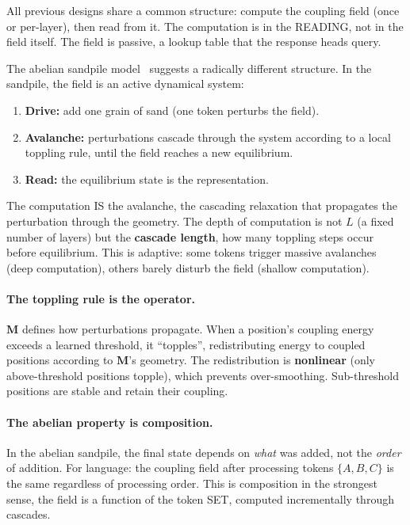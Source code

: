\documentclass[11pt, a4paper]{article}
\newcommand{\M}{\mathbf{M}}
\theoremstyle{plain}
\theoremstyle{definition}
\theoremstyle{remark}
\begin{document}
All previous designs share a common structure: compute the coupling field (once or per-layer), then read from it.
The computation is in the READING, not in the field itself.
The field is passive, a lookup table that the response heads query.

The abelian sandpile model~\cite{bak1987self} suggests a radically different structure.
In the sandpile, the field is an active dynamical system:
\begin{enumerate}[nosep]
\item \textbf{Drive:} add one grain of sand (one token perturbs the field).
\item \textbf{Avalanche:} perturbations cascade through the system according to a local toppling rule, until the field reaches a new equilibrium.
\item \textbf{Read:} the equilibrium state is the representation.
\end{enumerate}

The computation IS the avalanche, the cascading relaxation that propagates the perturbation through the geometry.
The depth of computation is not $L$ (a fixed number of layers) but the \textbf{cascade length}, how many toppling steps occur before equilibrium.
This is adaptive: some tokens trigger massive avalanches (deep computation), others barely disturb the field (shallow computation).

\paragraph{The toppling rule is the operator.}
$\M$ defines how perturbations propagate.
When a position's coupling energy exceeds a learned threshold, it ``topples'', redistributing energy to coupled positions according to $\M$'s geometry.
The redistribution is \textbf{nonlinear} (only above-threshold positions topple), which prevents over-smoothing.
Sub-threshold positions are stable and retain their coupling.

\paragraph{The abelian property is composition.}
In the abelian sandpile, the final state depends on \emph{what} was added, not the \emph{order} of addition.
For language: the coupling field after processing tokens $\{A, B, C\}$ is the same regardless of processing order.
This is composition in the strongest sense, the field is a function of the token SET, computed incrementally through cascades.
\end{document}
